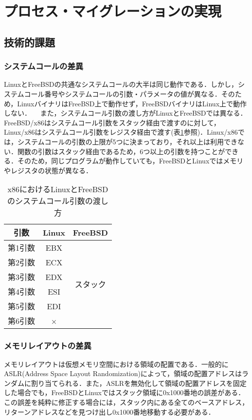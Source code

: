 \documentclass[11pt]{jarticle}
\begin{document}
\section{プロセス・マイグレーションの実現}
\label{sec:PM}
\subsection{技術的課題}
\subsubsection{システムコールの差異}
LinuxとFreeBSDの共通なシステムコールの大半は同じ動作である．しかし，システムコール番号やシステムコールの引数・パラメータの値が異なる．そのため，LinuxバイナリはFreeBSD上で動作せず，FreeBSDバイナリはLinux上で動作しない．
　また，システムコール引数の渡し方がLinuxとFreeBSDでは異なる．FreeBSD/x86はシステムコール引数をスタック経由で渡すのに対して，Linux/x86はシステムコール引数をレジスタ経由で渡す(表\ref{tb:argument}参照)．Linux/x86では，システムコールの引数の上限が5つに決まっており，それ以上は利用できない．関数の引数はスタック経由であるため，6つ以上の引数を持つことができる．そのため，同じプログラムが動作していても，FreeBSDとLinuxではメモリやレジスタの状態が異なる．

\begin{table}
  \caption{x86におけるLinuxとFreeBSDのシステムコール引数の渡し方}
  \label{tb:argument}
  \begin{center}
  \begin{tabular}{|c|c|c|} \hline
    引数 & Linux & FreeBSD \\ \hline \hline
    第1引数 & EBX &\multirow{6}{*}{スタック}   \\ \cline{1-2}
    第2引数 & ECX &  \\ \cline{1-2}
    第3引数 & EDX &  \\ \cline{1-2}
    第4引数 & ESI & \\ \cline{1-2}
    第5引数 & EDI &  \\ \cline{1-2}
    第6引数 & × &  \\ \hline
  \end{tabular}
\end{center}
\end{table}

\subsubsection{メモリレイアウトの差異}
メモリレイアウトは仮想メモリ空間における領域の配置である．一般的にASLR(Address Space Layout Randomization)によって，領域の配置アドレスはランダムに割り当てられる．また，ASLRを無効化して領域の配置アドレスを固定した場合でも，FreeBSDとLinuxではスタック領域に0x1000番地の誤差がある．この誤差を純粋に修正する場合には，スタック内にある全てのベースアドレス，リターンアドレスなどを見つけ出し0x1000番地移動する必要がある．
\end{document}
